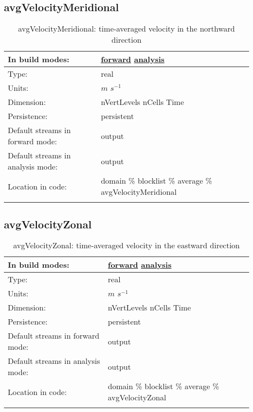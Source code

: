 \subsection[avgVelocityMeridional]{avgVelocityMeridional}
\label{subsec:var_sec_average_avgVelocityMeridional}
\begin{center}
\begin{longtable}{| p{2.0in} | p{4.0in} |}
        \hline 
        In build modes: & \hyperref[subsec:forward_var_tab_average]{forward} \hyperref[subsec:analysis_var_tab_average]{analysis} \\
        \hline 
        Type: & real \\
        \hline 
        Units: & $m$ $s^{-1}$ \\
        \hline 
        Dimension: & nVertLevels nCells Time \\
        \hline 
        Persistence: & persistent \\
        \hline 
		 Default streams in forward mode: &  output \\
        \hline 
		 Default streams in analysis mode: &  output \\
        \hline 
		 Location in code: & domain \% blocklist \% average \% avgVelocityMeridional \\
		 \hline 
    \caption{avgVelocityMeridional: time-averaged velocity in the northward direction}
\end{longtable}
\end{center}
\subsection[avgVelocityZonal]{avgVelocityZonal}
\label{subsec:var_sec_average_avgVelocityZonal}
\begin{center}
\begin{longtable}{| p{2.0in} | p{4.0in} |}
        \hline 
        In build modes: & \hyperref[subsec:forward_var_tab_average]{forward} \hyperref[subsec:analysis_var_tab_average]{analysis} \\
        \hline 
        Type: & real \\
        \hline 
        Units: & $m$ $s^{-1}$ \\
        \hline 
        Dimension: & nVertLevels nCells Time \\
        \hline 
        Persistence: & persistent \\
        \hline 
		 Default streams in forward mode: &  output \\
        \hline 
		 Default streams in analysis mode: &  output \\
        \hline 
		 Location in code: & domain \% blocklist \% average \% avgVelocityZonal \\
		 \hline 
    \caption{avgVelocityZonal: time-averaged velocity in the eastward direction}
\end{longtable}
\end{center}

